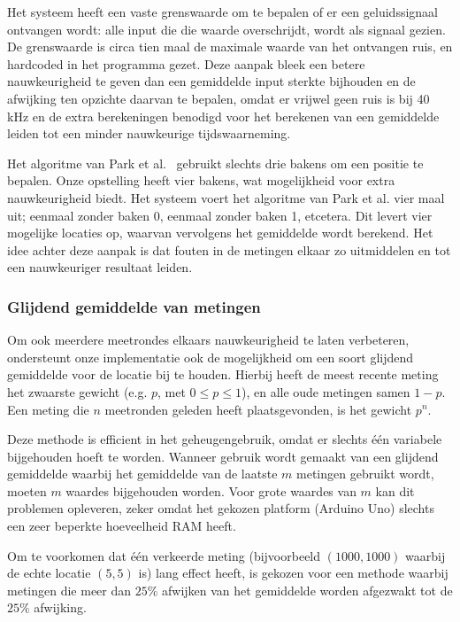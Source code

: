 \documentclass[a4paper,10pt]{article}
\begin{document}
Het systeem heeft een vaste grenswaarde om te bepalen of er een geluidssignaal ontvangen wordt: alle input die die waarde overschrijdt, wordt als signaal gezien. De grenswaarde is circa tien maal de maximale waarde van het ontvangen ruis, en hardcoded in het programma gezet. Deze aanpak bleek een betere nauwkeurigheid te geven dan een gemiddelde input sterkte bijhouden en de afwijking ten opzichte daarvan te bepalen, omdat er vrijwel geen ruis is bij 40 kHz en de extra berekeningen benodigd voor het berekenen van een gemiddelde leiden tot een minder nauwkeurige tijdswaarneming.

Het algoritme van Park et al.~\cite{park2011beacon} gebruikt slechts drie bakens om een positie te bepalen. Onze opstelling heeft vier bakens, wat mogelijkheid voor extra nauwkeurigheid biedt. Het systeem voert het algoritme van Park et al. vier maal uit; eenmaal zonder baken 0, eenmaal zonder baken 1, etcetera. Dit levert vier mogelijke locaties op, waarvan vervolgens het gemiddelde wordt berekend. Het idee achter deze aanpak is dat fouten in de metingen elkaar zo uitmiddelen en tot een nauwkeuriger resultaat leiden.

\subsubsection{Glijdend gemiddelde van metingen}
Om ook meerdere meetrondes elkaars nauwkeurigheid te laten verbeteren, ondersteunt onze implementatie ook de mogelijkheid om een soort glijdend gemiddelde voor de locatie bij te houden. Hierbij heeft de meest recente meting het zwaarste gewicht (e.g. $p$, met $0 \leq p \leq 1$), en alle oude metingen samen $1-p$. Een meting die $n$ meetronden geleden heeft plaatsgevonden, is het gewicht $p^{n}$.

Deze methode is efficient in het geheugengebruik, omdat er slechts \'e\'en variabele bijgehouden hoeft te worden. Wanneer gebruik wordt gemaakt van een glijdend gemiddelde waarbij het gemiddelde van de laatste $m$ metingen gebruikt wordt, moeten $m$ waardes bijgehouden worden. Voor grote waardes van $m$ kan dit problemen opleveren, zeker omdat het gekozen platform (Arduino Uno) slechts een zeer beperkte hoeveelheid RAM heeft.

Om te voorkomen dat \'e\'en verkeerde meting (bijvoorbeeld $(1000,1000)$ waarbij de echte locatie $(5,5)$ is) lang effect heeft, is gekozen voor een methode waarbij metingen die meer dan $25\%$ afwijken van het gemiddelde worden afgezwakt tot de $25\%$ afwijking.
\end{document}
